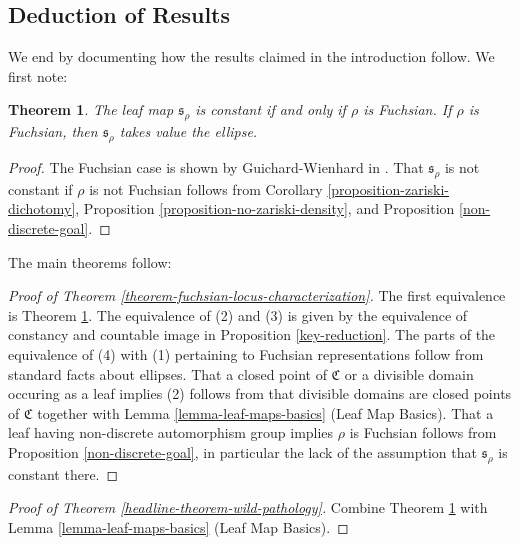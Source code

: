 \documentclass[12pt,a4paper]{amsart}
\theoremstyle{definition}
\theoremstyle{plain}
\newtheorem{theorem}{Theorem}[section]
\numberwithin{equation}{section}
\begin{document}
\subsection{Deduction of Results}\label{subsubsection-putting-it-together}

We end by documenting how the results claimed in the introduction follow. We first note:

\begin{theorem}\label{theorem-nonconstant-leafs}
    The leaf map $\mathfrak{s}_\rho$ is constant if and only if $\rho$ is Fuchsian. If $\rho$ is Fuchsian, then $\mathfrak{s}_\rho$ takes value the ellipse. 
\end{theorem}

\begin{proof}
    The Fuchsian case is shown by Guichard-Wienhard in \cite{guichard2008convex}. That $\mathfrak{s}_\rho$ is not constant if $\rho$ is not Fuchsian follows from Corollary \ref{proposition-zariski-dichotomy}, Proposition \ref{proposition-no-zariski-density}, and Proposition \ref{non-discrete-goal}. 
\end{proof}

The main theorems follow:

\begin{proof}[Proof of Theorem \ref{theorem-fuchsian-locus-characterization}]
    The first equivalence is Theorem \ref{theorem-nonconstant-leafs}. The equivalence of (2) and (3) is given by the equivalence of constancy and countable image in Proposition \ref{key-reduction}. The parts of the equivalence of (4) with (1) pertaining to Fuchsian representations follow from standard facts about ellipses. That a closed point of $\mathfrak{C}$ or a divisible domain occuring as a leaf implies (2) follows from that divisible domains are closed points of $\mathfrak{C}$ together with Lemma \ref{lemma-leaf-maps-basics} (Leaf Map Basics). That a leaf having non-discrete automorphism group implies $\rho$ is Fuchsian follows from Proposition \ref{non-discrete-goal}, in particular the lack of the assumption that $\mathfrak{s}_\rho$ is constant there. 
\end{proof}

\begin{proof}[Proof of Theorem \ref{headline-theorem-wild-pathology}]
    Combine Theorem \ref{theorem-nonconstant-leafs} with Lemma \ref{lemma-leaf-maps-basics} (Leaf Map Basics).
\end{proof}
\end{document}
